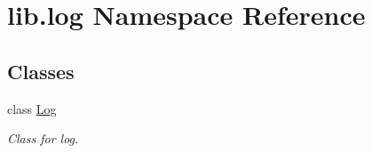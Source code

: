 \hypertarget{namespacelib_1_1log}{}\section{lib.\+log Namespace Reference}
\label{namespacelib_1_1log}
\subsection*{Classes}
\begin{DoxyCompactItemize}
\item 
class \hyperlink{classlib_1_1log_1_1_log}{Log}
\begin{DoxyCompactList}\small\item\em Class for log. \end{DoxyCompactList}\end{DoxyCompactItemize}
